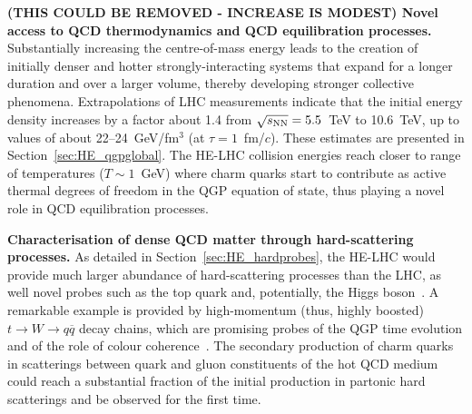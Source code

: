 \documentclass[../report.tex]{subfiles}
\begin{document}
	{\bf (THIS COULD BE REMOVED - INCREASE IS MODEST) Novel access to QCD thermodynamics and QCD equilibration processes.}
	Substantially increasing the centre-of-mass energy leads to the creation of initially denser and hotter strongly-interacting systems that expand for a longer duration and over a larger volume, thereby
	developing stronger collective phenomena. 
Extrapolations of LHC measurements indicate that the initial energy density increases by a factor about 1.4 from $\sqrt{s_{\rm NN}} = 5.5$~TeV to 10.6~TeV, up to values of about 22--24~GeV/fm$^3$ (at $\tau=1$~fm/$c$).
These estimates are presented in Section~\ref{sec:HE_qgpglobal}.
The HE-LHC collision energies reach closer to range of temperatures ($T\sim 1$~GeV) where charm quarks start to contribute as active thermal degrees of freedom in the QGP equation of state, thus playing a novel role in QCD equilibration processes. 

	 {\bf Characterisation of dense QCD matter through hard-scattering processes.}
As detailed in Section~\ref{sec:HE_hardprobes}, the HE-LHC would provide much larger abundance of hard-scattering processes than the LHC, as well novel probes such as the top quark and, potentially, the Higgs boson~\cite{Apolinario:2017sob,dEnterria:2015mgr,dEnterria:2017jyt}. 
A remarkable example is provided by high-momentum (thus, highly boosted) $t \to W \to q\overline q$ decay chains, which are promising probes of the QGP time evolution and of the role of colour coherence~\cite{Apolinario:2017sob}. 
The secondary production of charm quarks in scatterings between quark and gluon constituents of the hot QCD medium could reach a substantial fraction of the initial production in partonic hard scatterings and be observed for the first time. 
\end{document}
